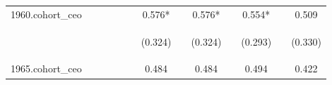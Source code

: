 \begin{center}
\begin{tabular}{lcccccccccccc}
1960.cohort\_ceo &  &  &  &  &  & 0.576* &  & 0.576* &  & 0.554* &  & 0.509 \\
\vspace{4pt} & \begin{footnotesize}\end{footnotesize} & \begin{footnotesize}\end{footnotesize} & \begin{footnotesize}\end{footnotesize} & \begin{footnotesize}\end{footnotesize} & \begin{footnotesize}\end{footnotesize} & \begin{footnotesize}(0.324)\end{footnotesize} & \begin{footnotesize}\end{footnotesize} & \begin{footnotesize}(0.324)\end{footnotesize} & \begin{footnotesize}\end{footnotesize} & \begin{footnotesize}(0.293)\end{footnotesize} & \begin{footnotesize}\end{footnotesize} & \begin{footnotesize}(0.330)\end{footnotesize} \\
1965.cohort\_ceo &  &  &  &  &  & 0.484 &  & 0.484 &  & 0.494 &  & 0.422 \\

\end{tabular}
\end{center}
